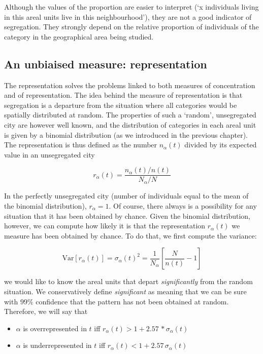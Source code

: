 Although the values of the proportion are easier to interpret (`x%
individuals living in this areal units live in this neighbourhood'), they are
not a good indicator of segregation. They strongly depend on the relative
proportion of individuals of the category in the geographical area being
studied. 

\subsection{An unbiaised measure: representation}
\label{sub:an_unbiaised_measure_the_representation}

The representation solves the problems linked to both measures of concentration
and of representation. The idea behind the measure of representation is that
segregation is a departure from the situation where all categories would be
spatially distributed at random. The properties of such a `random', unsegregated
city are however well known, and the distribution of categories in each areal
unit is given by a binomial distribution (as we introduced in the previous
chapter). The representation is thus defined as
the number $n_\alpha(t)$ divided by its expected value in an unsegregated city

\begin{equation}
    r_\alpha(t) = \frac{n_\alpha(t)/n(t)}{N_\alpha/N}
\end{equation}

In the perfectly unsegregated city (number of individuals equal to the mean of
the binomial distribution), $r_\alpha = 1$. Of course, there always is a
possibility for any situation that it has been obtained by chance. Given the
binomial distribution, however, we can compute how likely it is that the
representation $r_\alpha(t)$ we measure has been obtained by chance. To do that,
we first compute the variance:

\begin{equation}
    \mathrm{Var}\left[r_\alpha(t)\right] = \sigma_\alpha(t)^2 = \frac{1}{N_\alpha} \left[\frac{N}{n(t)} - 1\right]
\end{equation}

we would like to know the areal units that depart \emph{significantly} from the
random situation. We conservatively define \emph{significant} as meaning that we
can be sure with $99\%$ confidence that the pattern has not been obtained at
random. Therefore, we will say that  

\begin{itemize}
    \item $\alpha$ is overrepresented in $t$ iff $r_\alpha(t) > 1 +
  2.57\,*\sigma_\alpha(t)$
    \item $\alpha$ is underrepresented in $t$ iff $r_\alpha(t) < 1 +
  2.57\,\sigma_\alpha(t)$
\end{itemize}

